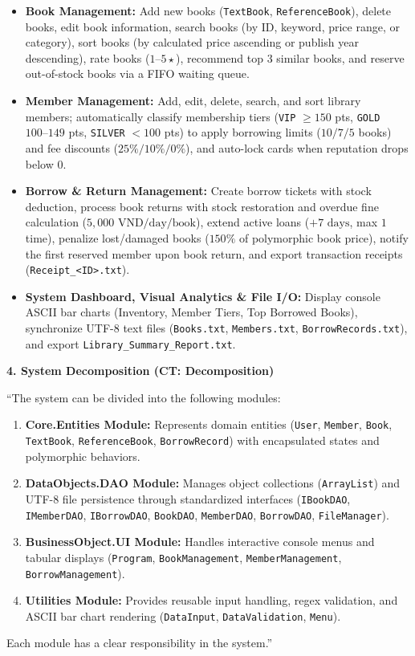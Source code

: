 \documentclass[12pt,a4paper]{article}
\begin{document}
\begin{itemize}[leftmargin=1.2cm]
    \item \textbf{Book Management:} Add new books (\texttt{TextBook}, \texttt{ReferenceBook}), delete books, edit book information, search books (by ID, keyword, price range, or category), sort books (by calculated price ascending or publish year descending), rate books ($1\text{--}5\star$), recommend top 3 similar books, and reserve out-of-stock books via a FIFO waiting queue.
    \item \textbf{Member Management:} Add, edit, delete, search, and sort library members; automatically classify membership tiers (\texttt{VIP} $\ge 150$ pts, \texttt{GOLD} $100\text{--}149$ pts, \texttt{SILVER} $< 100$ pts) to apply borrowing limits ($10 / 7 / 5$ books) and fee discounts ($25\% / 10\% / 0\%$), and auto-lock cards when reputation drops below $0$.
    \item \textbf{Borrow \& Return Management:} Create borrow tickets with stock deduction, process book returns with stock restoration and overdue fine calculation ($5,000\text{ VND/day/book}$), extend active loans ($+7\text{ days}$, max $1$ time), penalize lost/damaged books ($150\%$ of polymorphic book price), notify the first reserved member upon book return, and export transaction receipts (\texttt{Receipt\_<ID>.txt}).
    \item \textbf{System Dashboard, Visual Analytics \& File I/O:} Display console ASCII bar charts (Inventory, Member Tiers, Top Borrowed Books), synchronize UTF-8 text files (\texttt{Books.txt}, \texttt{Members.txt}, \texttt{BorrowRecords.txt}), and export \texttt{Library\_Summary\_Report.txt}.
\end{itemize}

\textbf{4. System Decomposition (CT: Decomposition)}

``The system can be divided into the following modules:
\begin{enumerate}[leftmargin=1.5cm]
    \item \textbf{Core.Entities Module:} Represents domain entities (\texttt{User}, \texttt{Member}, \texttt{Book}, \texttt{TextBook}, \texttt{ReferenceBook}, \texttt{BorrowRecord}) with encapsulated states and polymorphic behaviors.
    \item \textbf{DataObjects.DAO Module:} Manages object collections (\texttt{ArrayList}) and UTF-8 file persistence through standardized interfaces (\texttt{IBookDAO}, \texttt{IMemberDAO}, \texttt{IBorrowDAO}, \texttt{BookDAO}, \texttt{MemberDAO}, \texttt{BorrowDAO}, \texttt{FileManager}).
    \item \textbf{BusinessObject.UI Module:} Handles interactive console menus and tabular displays (\texttt{Program}, \texttt{BookManagement}, \texttt{MemberManagement}, \texttt{BorrowManagement}).
    \item \textbf{Utilities Module:} Provides reusable input handling, regex validation, and ASCII bar chart rendering (\texttt{DataInput}, \texttt{DataValidation}, \texttt{Menu}).
\end{enumerate}
Each module has a clear responsibility in the system.''
\end{document}

